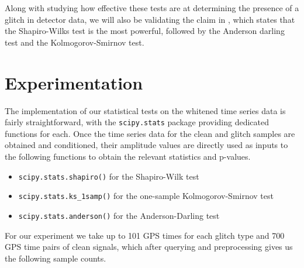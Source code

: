 \documentclass[12pt]{article}
\begin{document}
\medskip
\noindent Along with studying how effective these tests are at determining the presence of a glitch in detector data, we will also be validating the claim in \cite{razali2011power}, which states that the Shapiro-Wilks test is the most powerful, followed by the Anderson darling test and the Kolmogorov-Smirnov test.



\pagebreak
\section{Experimentation}\label{Experimentation}

The implementation of our statistical tests on the whitened time series data is fairly straightforward, with the \texttt{scipy.stats} package providing dedicated functions for each. Once the time series data for the clean and glitch samples are obtained and conditioned, their amplitude values are directly used as inputs to the following functions to obtain the relevant statistics and p-values.

\begin{itemize}
  \item \texttt{scipy.stats.shapiro()} for the Shapiro-Wilk test
  \item \texttt{scipy.stats.ks\_1samp()} for the one-sample Kolmogorov-Smirnov test
  \item \texttt{scipy.stats.anderson()} for the Anderson-Darling test
\end{itemize}

\medskip
\noindent For our experiment we take up to 101 GPS times for each glitch type and 700 GPS time pairs of clean signals, which after querying and preprocessing gives us the following sample counts.
\end{document}

